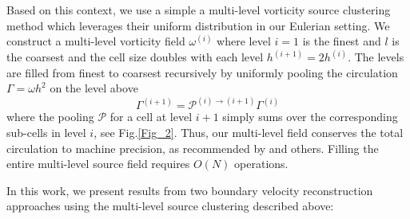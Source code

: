 \documentclass[final,1p,times]{elsarticle}
\begin{document}
Based on this context, we use a simple a multi-level vorticity source clustering method which leverages their uniform distribution in our Eulerian setting. We construct a multi-level vorticity field $\omega^{(i)}$ where level $i=1$ is the finest and $l$ is the coarsest and the cell size doubles with each level $h^{(i+1)}=2h^{(i)}$. The levels are filled from finest to coarsest recursively by uniformly pooling the circulation $\Gamma=\omega h^2$ on the level above 
\begin{equation}
\Gamma^{(i+1)}=\mathcal{P}^{(i)\to(i+1)}\Gamma^{(i)}
\end{equation}
where the pooling $\mathcal{P}$ for a cell at level $i+1$ simply sums over the corresponding sub-cells in level $i$, see Fig.\ref{Fig_2}. Thus, our multi-level field conserves the total circulation to machine precision, as recommended by \cite{Colonius2008} and others. Filling the entire multi-level source field requires $O(N)$ operations.

In this work, we present results from two boundary velocity reconstruction approaches using the multi-level source clustering described above:
\end{document}
